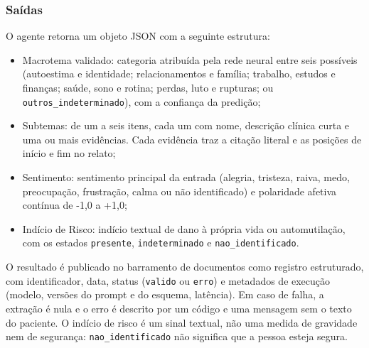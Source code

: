 \documentclass[12pt,a4paper]{article}
\begin{document}
\subsubsection{Saídas}
O agente retorna um objeto JSON com a seguinte estrutura:
\begin{itemize}
    \item Macrotema validado: categoria atribuída pela rede neural entre seis possíveis
          (autoestima e identidade; relacionamentos e família; trabalho, estudos e finanças;
          saúde, sono e rotina; perdas, luto e rupturas; ou \texttt{outros\_indeterminado}),
          com a confiança da predição;
    \item Subtemas: de um a seis itens, cada um com nome, descrição clínica curta e uma ou
          mais evidências. Cada evidência traz a citação literal e as posições de início e
          fim no relato;
    \item Sentimento: sentimento principal da entrada (alegria, tristeza, raiva, medo,
          preocupação, frustração, calma ou não identificado) e polaridade afetiva contínua
          de -1,0 a +1,0;
    \item Indício de Risco: indício textual de dano à própria vida ou automutilação, com os
          estados \texttt{presente}, \texttt{indeterminado} e \texttt{nao\_identificado}.
\end{itemize}
O resultado é publicado no barramento de documentos como registro estruturado, com identificador, data, status (\texttt{valido} ou \texttt{erro}) e
metadados de execução (modelo, versões do prompt e do esquema, latência). Em caso de falha,
a extração é nula e o erro é descrito por um código e uma mensagem sem o texto do paciente.
O indício de risco é um sinal textual, não uma medida de gravidade nem de segurança:
\texttt{nao\_identificado} não significa que a pessoa esteja segura.
\end{document}
